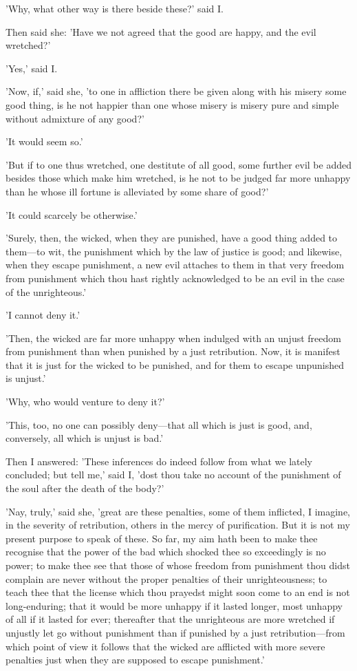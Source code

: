 'Why, what other way is there beside these?' said I.

Then said she: 'Have we not agreed that the good are happy, and the evil
wretched?'

'Yes,' said I.

'Now, if,' said she, 'to one in affliction there be given along with his
misery some good thing, is he not happier than one whose misery is
misery pure and simple without admixture of any good?'

'It would seem so.'

'But if to one thus wretched, one destitute of all good, some further
evil be added besides those which make him wretched, is he not to be
judged far more unhappy than he whose ill fortune is alleviated by some
share of good?'

'It could scarcely be otherwise.'

'Surely, then, the wicked, when they are punished, have a good thing
added to them—to wit, the punishment which by the law of justice is
good; and likewise, when they escape punishment, a new evil attaches to
them in that very freedom from punishment which thou hast rightly
acknowledged to be an evil in the case of the unrighteous.'

'I cannot deny it.'

'Then, the wicked are far more unhappy when indulged with an unjust
freedom from punishment than when punished by a just retribution. Now,
it is manifest that it is just for the wicked to be punished, and for
them to escape unpunished is unjust.'

'Why, who would venture to deny it?'

'This, too, no one can possibly deny—that all which is just is good,
and, conversely, all which is unjust is bad.'

Then I answered: 'These inferences do indeed follow from what we lately
concluded; but tell me,' said I, 'dost thou take no account of the
punishment of the soul after the death of the body?'

'Nay, truly,' said she, 'great are these penalties, some of them
inflicted, I imagine, in the severity of retribution, others in the
mercy of purification. But it is not my present purpose to speak of
these. So far, my aim hath been to make thee recognise that the power of
the bad which shocked thee so exceedingly is no power; to make thee see
that those of whose freedom from punishment thou didst complain are
never without the proper penalties of their unrighteousness; to teach
thee that the license which thou prayedst might soon come to an end is
not long-enduring; that it would be more unhappy if it lasted longer,
most unhappy of all if it lasted for ever; thereafter that the
unrighteous are more wretched if unjustly let go without punishment than
if punished by a just retribution—from which point of view it follows
that the wicked are afflicted with more severe penalties just when they
are supposed to escape punishment.'

